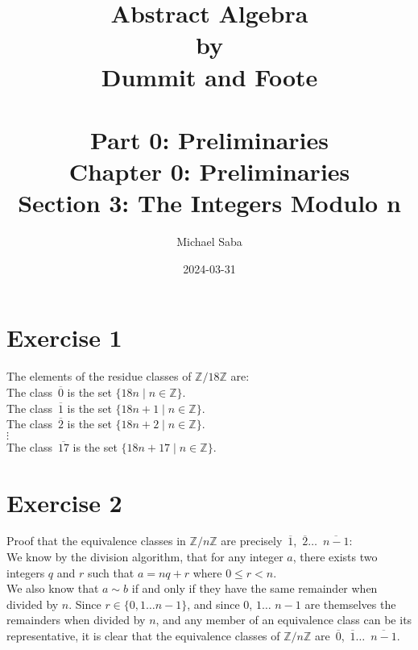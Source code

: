 \documentclass[12pt]{article}
\title{%
    \Huge Abstract Algebra \\
    \large by \\
    \Large Dummit and Foote \\~\\
    \huge Part 0: Preliminaries \\
    \LARGE Chapter 0: Preliminaries \\
    \Large Section 3: The Integers Modulo n
}
\date{2024-03-31}
\author{Michael Saba}
\newcommand{\Z}{\mathbb{Z}}
\newcommand{\olsi}[1]{\,\overline{{#1}}}
\begin{document}
    \maketitle
    \newpage

    \section*{Exercise 1}

    The elements of the residue classes of $\Z/18\Z$ are: \\
    The class $\olsi{0}$ is the set $\{ 18n \mid n \in \Z \}$. \\
    The class $\olsi{1}$ is the set $\{ 18n + 1 \mid n \in \Z \}$. \\
    The class $\olsi{2}$ is the set $\{ 18n + 2 \mid n \in \Z \}$. \\
    $\vdots$ \\
    The class $\olsi{17}$ is the set $\{ 18n + 17 \mid n \in \Z \}$. \\

    \section*{Exercise 2}
    Proof that the equivalence classes in $\Z/n\Z$
    are precisely $\olsi{1}$, $\olsi{2}\dots$ $\olsi{n-1}$: \\
    We know by the division algorithm,
    that for any integer $a$, 
    there exists two integers $q$ and $r$
    such that $a = nq + r$ where $0 \leqslant r < n$. \\
    We also know that $a \sim b$ if and only if
    they have the same remainder when divided by $n$.
    Since $r \in \{ 0, 1 \dots n-1 \}$,
    and since $0$, $1\dots$ $n-1$ are themselves the remainders
    when divided by $n$,
    and any member of an equivalence class can be its representative,
    it is clear that the equivalence classes of $\Z/n\Z$
    are $\olsi{0}$, $\olsi{1}\dots$ $\olsi{n-1}$. \\
\end{document}
